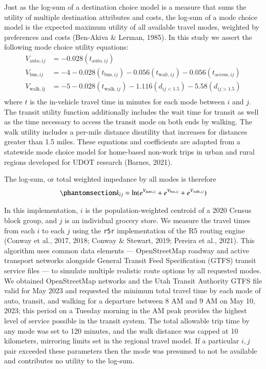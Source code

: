 \documentclass[
  letterpaper,
  number,
  review,
  3p]{elsarticle}
\begin{document}
Just as the log-sum of a destination choice model is a measure that sums
the utility of multiple destination attributes and costs, the log-sum of
a mode choice model is the expected maximum utility of all available
travel modes, weighted by preferences and costs (Ben-Akiva \& Lerman,
1985). In this study we assert the following mode choice utility
equations: \begin{align*} 
  V_{\mathrm{auto}, ij} &= -0.028(t_{\mathrm{auto}, ij})\\
  V_{\mathrm{bus}, ij} &= -4 -0.028(t_{\mathrm{bus}, ij}) -0.056(t_{\mathrm{wait}, ij}) -0.056(t_{\mathrm{access}, ij})\\
  V_{\mathrm{walk, ij}} &= -5 -0.028(t_{\mathrm{walk}, ij}) -1.116(d_{ij<1.5}) -5.58(d_{ij>1.5})\\
\end{align*} where \(t\) is the in-vehicle travel time in minutes for
each mode between \(i\) and \(j\). The transit utility function
additionally includes the wait time for transit as well as the time
necessary to access the transit mode on both ends by walking. The walk
utility includes a per-mile distance disutility that increases for
distances greater than 1.5 miles. These equations and coefficients are
adapted from a statewide mode choice model for home-based non-work trips
in urban and rural regions developed for UDOT research (Barnes, 2021).

The log-sum, or total weighted impedance by all modes is therefore
\begin{equation}\phantomsection\label{eq-mcls}{
k_{ij} = \ln(e^{V_{\mathrm{auto}, ij}} + e^{V_{\mathrm{bus}, ij}} + e^{V_{\mathrm{walk},ij}})
}\end{equation}

In this implementation, \(i\) is the population-weighted centroid of a
2020 Census block group, and \(j\) is an individual grocery store. We
measure the travel times from each \(i\) to each \(j\) using the
\texttt{r5r} implementation of the R5 routing engine (Conway et al.,
2017, 2018; Conway \& Stewart, 2019; Pereira et al., 2021). This
algorithm uses common data elements --- OpenStreetMap roadway and active
transport networks alongside General Transit Feed Specification (GTFS)
transit service files --- to simulate multiple realistic route options
by all requested modes. We obtained OpenStreetMap networks and the Utah
Transit Authority GTFS file valid for May 2023 and requested the minimum
total travel time by each mode of auto, transit, and walking for a
departure between 8 AM and 9 AM on May 10, 2023; this period on a
Tuesday morning in the AM peak provides the highest level of service
possible in the transit system. The total allowable trip time by any
mode was set to 120 minutes, and the walk distance was capped at 10
kilometers, mirroring limits set in the regional travel model. If a
particular \(i,j\) pair exceeded these parameters then the mode was
presumed to not be available and contributes no utility to the log-sum.
\end{document}

